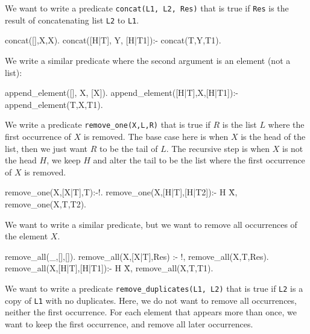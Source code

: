 We want to write a predicate \texttt{concat(L1, L2, Res)} that is true if \texttt{Res} is the result of concatenating list \texttt{L2} to \texttt{L1}.

\begin{codeblock}
concat([],X,X).
concat([H|T], Y, [H|T1]):-
    concat(T,Y,T1).
\end{codeblock}



We write a similar predicate where the second argument is an element (not a list):

\begin{codeblock}
append_element([], X, [X]).
append_element([H|T],X,[H|T1]):-
    append_element(T,X,T1).
\end{codeblock}


We write a predicate \texttt{remove\_one(X,L,R)} that is true if $R$ is the list $L$ where the first occurrence of $X$ is removed. The base case here is when $X$ is the head of the list, then we just want $R$ to be the tail of $L$. The recursive step is when $X$ is not the head $H$, we keep $H$ and alter the tail to be the list where the first occurrence of $X$ is removed.

\begin{codeblock}
remove_one(X,[X|T],T):-!.
remove_one(X,[H|T],[H|T2]):-
    H \= X,
    remove_one(X,T,T2).
\end{codeblock}


We want to write a similar predicate, but we want to remove all occurrences of the element $X$.

\begin{codeblock}
remove_all(_,[],[]).
remove_all(X,[X|T],Res) :-
    !,
    remove_all(X,T,Res).
remove_all(X,[H|T],[H|T1]):-
    H \= X,
    remove_all(X,T,T1).
\end{codeblock}


We want to write a predicate \texttt{remove\_duplicates(L1, L2)} that is true if \texttt{L2} is a copy of \texttt{L1} with no duplicates. Here, we do not want to remove all occurrences, neither the first occurrence. For each element that appears more than once, we want to keep the first occurrence, and remove all later occurrences.

